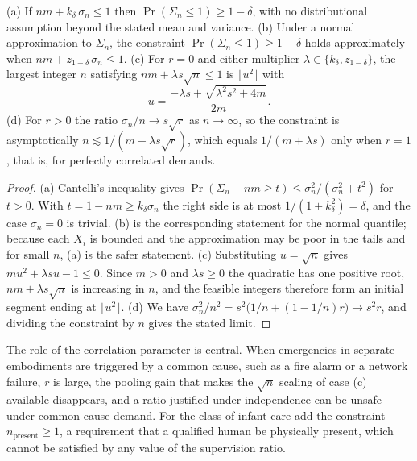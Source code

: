 \begin{proposition}
(a) If $nm+k_\delta\,\sigma_n\le1$ then $\Pr(\Sigma_n\le1)\ge1-\delta$, with no distributional assumption beyond the stated mean and variance. (b) Under a normal approximation to $\Sigma_n$, the constraint $\Pr(\Sigma_n\le1)\ge1-\delta$ holds approximately when $nm+z_{1-\delta}\,\sigma_n\le1$. (c) For $r=0$ and either multiplier $\lambda\in\{k_\delta,z_{1-\delta}\}$, the largest integer $n$ satisfying $nm+\lambda s\sqrt n\le1$ is $\lfloor u^2\rfloor$ with
\[
u=\frac{-\lambda s+\sqrt{\lambda^2s^2+4m}}{2m}.
\]
(d) For $r>0$ the ratio $\sigma_n/n\to s\sqrt r$ as $n\to\infty$, so the constraint is asymptotically $n\lesssim 1/(m+\lambda s\sqrt r)$, which equals $1/(m+\lambda s)$ only when $r=1$, that is, for perfectly correlated demands.
\end{proposition}

\begin{proof}
(a) Cantelli's inequality gives $\Pr(\Sigma_n-nm\ge t)\le\sigma_n^2/(\sigma_n^2+t^2)$ for $t>0$. With $t=1-nm\ge k_\delta\sigma_n$ the right side is at most $1/(1+k_\delta^2)=\delta$, and the case $\sigma_n=0$ is trivial. (b) is the corresponding statement for the normal quantile; because each $X_i$ is bounded and the approximation may be poor in the tails and for small $n$, (a) is the safer statement. (c) Substituting $u=\sqrt n$ gives $mu^2+\lambda su-1\le0$. Since $m>0$ and $\lambda s\ge0$ the quadratic has one positive root, $nm+\lambda s\sqrt n$ is increasing in $n$, and the feasible integers therefore form an initial segment ending at $\lfloor u^2\rfloor$. (d) We have $\sigma_n^2/n^2=s^2\big(1/n+(1-1/n)r\big)\to s^2r$, and dividing the constraint by $n$ gives the stated limit.
\end{proof}

The role of the correlation parameter is central. When emergencies in separate embodiments are triggered by a common cause, such as a fire alarm or a network failure, $r$ is large, the pooling gain that makes the $\sqrt n$ scaling of case (c) available disappears, and a ratio justified under independence can be unsafe under common-cause demand. For the class of infant care add the constraint $n_{\mathrm{present}}\ge1$, a requirement that a qualified human be physically present, which cannot be satisfied by any value of the supervision ratio.
